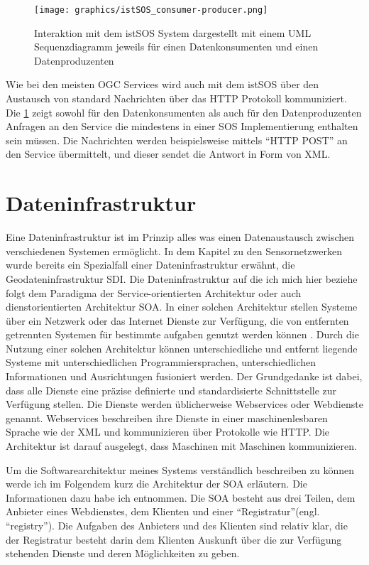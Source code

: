 \begin{figure}[H]
	\centering
 	 \texttt{[image: graphics/istSOS\_consumer-producer.png]} 
	\caption{Interaktion mit dem istSOS System dargestellt mit einem UML Sequenzdiagramm jeweils für einen Datenkonsumenten und einen Datenproduzenten \citep{cannata_welcome_2014}}
	 \label{fig:istsos_consumer-producer}
\end{figure}

Wie bei den meisten \gls{OGC} Services wird auch mit dem \gls{istSOS} über den Austausch von standard Nachrichten über das \gls{HTTP} Protokoll kommuniziert. Die  \ref{fig:istsos_consumer-producer} zeigt sowohl für den Datenkonsumenten als auch für den Datenproduzenten Anfragen an den Service die mindestens in einer \gls{SOS} Implementierung enthalten sein müssen. Die Nachrichten werden beispielsweise mittels ``HTTP POST'' an den Service übermittelt, und dieser sendet die Antwort in Form von \gls{XML}. 


\section{Dateninfrastruktur}
Eine Dateninfrastruktur ist im Prinzip alles was einen Datenaustausch zwischen verschiedenen Systemen ermöglicht. In dem Kapitel zu den Sensornetzwerken wurde bereits ein Spezialfall einer Dateninfrastruktur erwähnt, die Geodateninfrastruktur \gls{SDI}. Die Dateninfrastruktur auf die ich mich hier beziehe folgt dem Paradigma der Service-orientierten Architektur oder auch dienstorientierten Architektur \gls{SOA}. In einer solchen Architektur stellen Systeme über ein Netzwerk oder das Internet Dienste zur Verfügung, die von entfernten getrennten Systemen für bestimmte aufgaben genutzt werden können \citep{papazoglou_web_2008}. Durch die Nutzung einer solchen Architektur können unterschiedliche und entfernt liegende Systeme mit unterschiedlichen Programmiersprachen, unterschiedlichen Informationen und Ausrichtungen fusioniert werden. Der Grundgedanke ist dabei, dass alle Dienste eine präzise definierte und standardisierte Schnittstelle zur Verfügung stellen. Die Dienste werden üblicherweise Webservices oder Webdienste genannt. Webservices beschreiben ihre Dienste in einer maschinenlesbaren Sprache wie der \gls{XML} und kommunizieren über Protokolle wie \gls{HTTP}. Die Architektur ist darauf ausgelegt, dass Maschinen mit Maschinen kommunizieren.

Um die Softwarearchitektur meines Systems verständlich beschreiben zu können werde ich im Folgendem kurz die Architektur der \gls{SOA} erläutern. Die Informationen dazu habe ich \citep{papazoglou_web_2008} entnommen. Die \gls{SOA} besteht aus drei Teilen, dem Anbieter eines Webdienstes, dem Klienten und einer ``Registratur''(engl. ``registry''). Die Aufgaben des Anbieters und des Klienten sind relativ klar, die der Registratur besteht darin dem Klienten Auskunft über die zur Verfügung stehenden Dienste und deren Möglichkeiten zu geben. 

